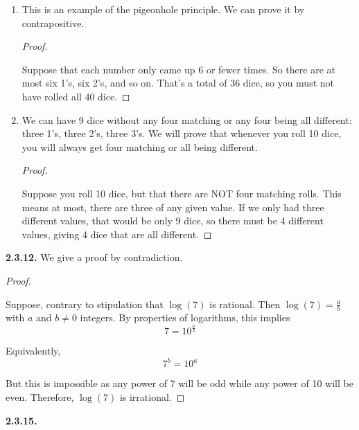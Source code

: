 \documentclass[12pt,]{book}
\theoremstyle{plain}
\theoremstyle{definition}
\theoremstyle{definition}
\theoremstyle{definition}
\numberwithin{equation}{chapter}
\begin{document}
\begin{enumerate}[label=(\alph*)]
\item\hypertarget{li-684}{}\hypertarget{p-1461}{}%
This is an example of the pigeonhole principle. We can prove it by contrapositive.%
\begin{proof}\hypertarget{proof-36}{}
\hypertarget{p-1462}{}%
Suppose that each number only came up 6 or fewer times. So there are at most six 1's, six 2's, and so on. That's a total of 36 dice, so you must not have rolled all 40 dice.%
\end{proof}
\item\hypertarget{li-685}{}\hypertarget{p-1463}{}%
We can have 9 dice without any four matching or any four being all different: three 1's, three 2's, three 3's. We will prove that whenever you roll 10 dice, you will always get four matching or all being different.%
\begin{proof}\hypertarget{proof-37}{}
\hypertarget{p-1464}{}%
Suppose you roll 10 dice, but that there are NOT four matching rolls. This means at most, there are three of any given value. If we only had three different values, that would be only 9 dice, so there must be 4 different values, giving 4 dice that are all different.%
\end{proof}
\end{enumerate}
%
\par\smallskip
\noindent\textbf{2.3.12.} \hypertarget{p-1466}{}%
We give a proof by contradiction.%
\begin{proof}\hypertarget{proof-38}{}
\hypertarget{p-1467}{}%
Suppose, contrary to stipulation that \(\log(7)\) is rational. Then \(\log(7) = \frac{a}{b}\) with \(a\) and \(b \ne 0\) integers. By properties of logarithms, this implies%
\begin{equation*}
7 = 10^{\frac{a}{b}}
\end{equation*}
%
\par
\hypertarget{p-1468}{}%
Equivalently,%
\begin{equation*}
7^b = 10^a
\end{equation*}
%
\par
\hypertarget{p-1469}{}%
But this is impossible as any power of 7 will be odd while any power of 10 will be even.  Therefore, \(\log(7)\) is irrational.%
\end{proof}
\par\smallskip
\noindent\textbf{2.3.15.} \hypertarget{p-1478}{}%
\leavevmode%
\end{document}
